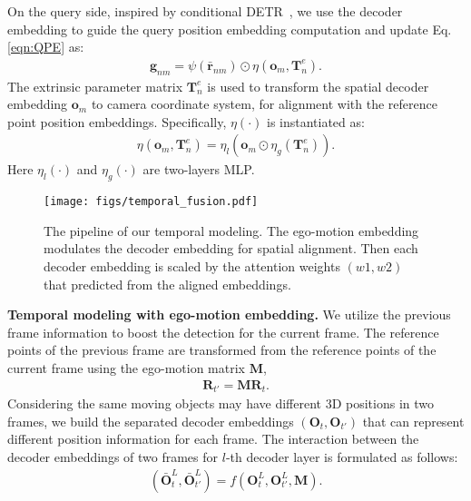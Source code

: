 \documentclass[10pt,twocolumn,letterpaper]{article}
\begin{document}
On the query side, inspired by conditional DETR~\cite{meng2021conditional}, we use the decoder embedding
to guide the query position embedding computation 
and update Eq.\ref{eqn:QPE} as:
\begin{align}
\mathbf{g}_{nm} = \psi(\bar{\mathbf{r}}_{nm})\odot \eta(\mathbf{o}_m, \mathbf{T}_{n}^{e}).
\end{align}
The extrinsic parameter matrix $\mathbf{T}_{n}^{e}$
is used to transform the spatial decoder embedding $\mathbf{o}_m$
to camera coordinate system,
for alignment with the reference point position embeddings.
Specifically, $\eta(\cdot)$ is instantiated as:
\begin{align}
\label{eq:cam_extrin_modulate}
\eta(\mathbf{o}_m, \mathbf{T}_{n}^{e}) = 
\eta_l(\mathbf{o}_m \odot \eta_g(\mathbf{T}_{n}^{e})).
\end{align}
Here $\eta_l(\cdot)$ and $\eta_g(\cdot)$ are two-layers MLP.










\begin{figure}[t]
\centering
\texttt{[image: figs/temporal\_fusion.pdf]}
\caption{The pipeline of our  temporal modeling. The ego-motion embedding modulates the decoder embedding for spatial alignment. Then each decoder embedding is scaled by the attention weights $(w1, w2)$ that predicted from the aligned embeddings.
}
\centering
\label{fig:temporal}
\end{figure}

\noindent\textbf{Temporal modeling
with ego-motion embedding.}
We utilize the previous frame information
to boost the detection
for the current frame.
The reference points of the previous frame
are transformed 
from the reference points
of the current frame
using the ego-motion matrix $\mathbf{M}$,
\begin{align}
    \mathbf{R}_{t'}
    = \mathbf{M}\mathbf{R}_t.
\end{align}
Considering the same moving objects may have different 3D positions in two frames, we build the separated decoder embeddings $(\mathbf{O}_{t}, \mathbf{O}_{t'})$ that can represent different position information for each frame. The interaction between the decoder embeddings of two frames for $l$-th decoder layer is formulated as follows:
\begin{align}
    (\bar{\mathbf{O}}_{t}^L,
    \bar{\mathbf{O}}_{t'}^L)
    = f(\mathbf{O}_{t}^{L}, \mathbf{O}_{t'}^{L}, \mathbf{M}).
\end{align}
\end{document}
